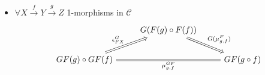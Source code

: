 \begin{defi}
\begin{itemize}
\begin{itemize}
			\item 
			$ \forall X \xrightarrow{ f } Y \xrightarrow{ g } Z$ 
			1-morphisms in $ \mathcal{ C }$
			\[
			\begin{tikzcd}
				&
				G ( F ( g ) \circ F ( f ) )
				\ar[rd, Rightarrow, " G ( \mu_{ g , f }^F) "]
				\\
				GF ( g ) \circ GF ( f ) 
				\ar[ru, Rightarrow, " \epsilon_{FX}^G"]
				\ar[rr, Rightarrow, equal, " \mu_{ g , f }^{ G F}"']
				&&
				GF ( g \circ f )
			\end{tikzcd}
			\]
		\end{itemize}
	\end{itemize}
\end{defi}

